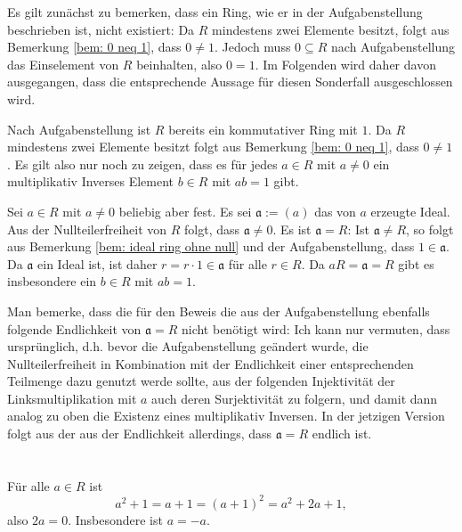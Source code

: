 \documentclass[a4paper,10pt]{article}
\theoremstyle{definition}
\newcommand{\mf}[1]{\mathfrak{#1}}
\begin{document}
Es gilt zunächst zu bemerken, dass ein Ring, wie er in der Aufgabenstellung beschrieben ist, nicht existiert: Da $R$ mindestens zwei Elemente besitzt, folgt aus Bemerkung \ref{bem: 0 neq 1}, dass $0 \neq 1$. Jedoch muss $0 \subseteq R$ nach Aufgabenstellung das Einselement von $R$ beinhalten, also $0 = 1$. Im Folgenden wird daher davon ausgegangen, dass die entsprechende Aussage für diesen Sonderfall ausgeschlossen wird.

Nach Aufgabenstellung ist $R$ bereits ein kommutativer Ring mit $1$. Da $R$ mindestens zwei Elemente besitzt folgt aus Bemerkung \ref{bem: 0 neq 1}, dass $0 \neq 1$. Es gilt also nur noch zu zeigen, dass es für jedes $a \in R$ mit $a \neq 0$ ein multiplikativ Inverses Element $b \in R$ mit $ab = 1$ gibt.

Sei $a \in R$ mit $a \neq 0$ beliebig aber fest. Es sei $\mf{a} := (a)$ das von $a$ erzeugte Ideal. Aus der Nullteilerfreiheit von $R$ folgt, dass $\mf{a} \neq 0$. Es ist $\mf{a} = R$: Ist $\mf{a} \neq R$, so folgt aus Bemerkung \ref{bem: ideal ring ohne null} und der Aufgabenstellung, dass $1 \in \mf{a}$. Da $\mf{a}$ ein Ideal ist, ist daher $r = r \cdot 1 \in \mf{a}$ für alle $r \in R$. Da $aR = \mf{a} = R$ gibt es insbesondere ein $b \in R$ mit $ab = 1$.

Man bemerke, dass die für den Beweis die aus der Aufgabenstellung ebenfalls folgende Endlichkeit von $\mf{a} = R$ nicht benötigt wird: Ich kann nur vermuten, dass ursprünglich, d.h. bevor die Aufgabenstellung geändert wurde, die Nullteilerfreiheit in Kombination mit der Endlichkeit einer entsprechenden Teilmenge dazu genutzt werde sollte, aus der folgenden Injektivität der Linksmultiplikation mit $a$ auch deren Surjektivität zu folgern, und damit dann analog zu oben die Existenz eines multiplikativ Inversen. In der jetzigen Version folgt aus der aus der Endlichkeit allerdings, dass $\mf{a} = R$ endlich ist.





\section{}


\addtocounter{subsection}{1}
\subsection{}
Für alle $a \in R$ ist
\[
 a^2 + 1 = a+1 = (a+1)^2 = a^2 + 2a + 1,
\]
also $2a = 0$. Insbesondere ist $a = -a$.
\end{document}
